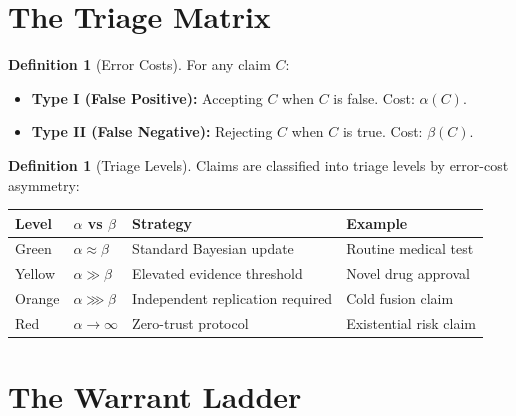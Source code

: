 \documentclass[12pt, a4paper]{article}
\theoremstyle{plain}
\theoremstyle{definition}
\newtheorem{definition}[theorem]{Definition}
\theoremstyle{remark}
\begin{document}
\section{The Triage Matrix}\label{sec:triage}

\begin{definition}[Error Costs]\label{def:errors}
  For any claim $C$:
  \begin{itemize}
    \item \textbf{Type I (False Positive):} Accepting $C$ when $C$
      is false. Cost: $\alpha(C)$.
    \item \textbf{Type II (False Negative):} Rejecting $C$ when $C$
      is true. Cost: $\beta(C)$.
  \end{itemize}
\end{definition}

\begin{definition}[Triage Levels]\label{def:triage_levels}
  Claims are classified into triage levels by error-cost asymmetry:
  \begin{center}
  \begin{tabular}{llll}
    \toprule
    \textbf{Level} & \textbf{$\alpha$ vs $\beta$} & \textbf{Strategy}
    & \textbf{Example} \\
    \midrule
    Green & $\alpha \approx \beta$ & Standard Bayesian update
    & Routine medical test \\
    Yellow & $\alpha \gg \beta$ & Elevated evidence threshold
    & Novel drug approval \\
    Orange & $\alpha \ggg \beta$ & Independent replication required
    & Cold fusion claim \\
    Red & $\alpha \to \infty$ & Zero-trust protocol
    & Existential risk claim \\
    \bottomrule
  \end{tabular}
  \end{center}
\end{definition}

\section{The Warrant Ladder}\label{sec:warrant}
\end{document}

